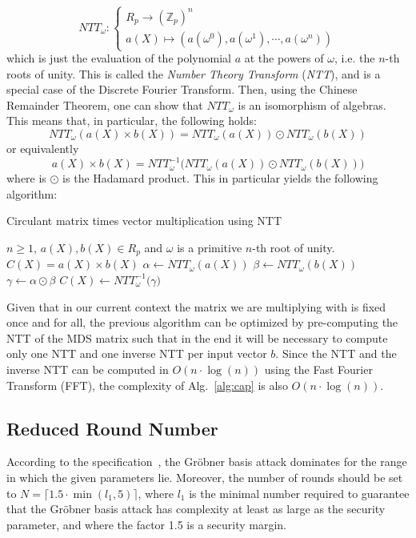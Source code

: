\documentclass[a4paper]{article}
\begin{document}
\begin{equation}
	NTT_{\omega} :
	\begin{cases}
		R_p \longrightarrow \left({\mathbb{Z}_p}\right)^n\\
		a(X) \mapsto \left(a(\omega^0), a(\omega^1),\cdots, a(\omega^n)\right)
	\end{cases}       
\end{equation}
which is just the evaluation of the polynomial $a$ at the powers of $\omega$, i.e. the $n$-th roots of unity. This is called the \textit{Number Theory Transform} (\textit{NTT}), and is a special case of the Discrete Fourier Transform. Then, using the Chinese Remainder Theorem, one can show that $NTT_{\omega}$ is an isomorphism of algebras. This means that, in particular, the following holds:\[NTT_{\omega}\left(a(X)\times b(X)\right) = NTT_{\omega}(a(X)) \odot  NTT_{\omega}(b(X)) \]
or equivalently \[a(X)\times b(X) = NTT_{\omega}^{-1}\big(NTT_{\omega}(a(X)) \odot  NTT_{\omega}(b(X))\big) \] 
where is $\odot$ is the Hadamard product.
This in particular yields the following algorithm:
\begin{algorithm}
	\caption{Circulant matrix times vector multiplication using NTT}\label{alg:cap}
	\begin{algorithmic}
		\Require $n \geq 1$, $a(X), b(X) \in R_p$ and $\omega$ is a primitive $n$-th root of unity.
		\Ensure $C(X) = a(X)\times b(X)$
		\State $\alpha \gets NTT_{\omega}(a(X))$
		\State $\beta \gets NTT_{\omega}(b(X))$
		\State $\gamma \gets \alpha\odot \beta$
		\State $C(X) \gets  NTT_{\omega}^{-1}\big(\gamma\big)$
	\end{algorithmic}
\end{algorithm}

Given that in our current context the matrix we are multiplying with is fixed once and for all, the previous algorithm can be optimized by pre-computing the NTT of the MDS matrix such that in the end it will be necessary to compute only one NTT and one inverse NTT per input vector $b$. Since the NTT and the inverse NTT can be computed in $O(n \cdot\log(n))$ using the Fast Fourier Transform (FFT), the complexity of Alg.~\ref{alg:cap} is also $O(n \cdot\log(n))$.

\subsection{Reduced Round Number}
\label{section:round-number}

According to the specification~\cite{cryptoeprint:2020/1143}, the Gröbner basis attack dominates for the range in which the given parameters lie. Moreover, the number of rounds should be set to $N = \lceil 1.5 \cdot \min(l_1, 5)\rceil$, where $l_1$ is the minimal number required to guarantee that the Gröbner basis attack has complexity at least as large as the security parameter, and where the factor 1.5 is a security margin.
\end{document}
